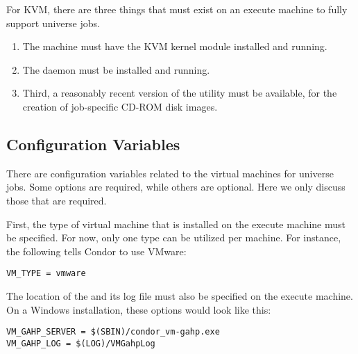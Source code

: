 For KVM, there are three things that must exist on
an execute machine to fully support  universe jobs. 
\begin{enumerate}
\item
The machine must have the KVM kernel module installed and running.

\item
The  daemon must be installed and running.

\item
Third, a reasonably recent version of the  
utility must be available,
for the creation of job-specific CD-ROM disk images. 
\end{enumerate}

\subsection{Configuration Variables}

There are configuration variables related to the virtual machines
for  universe jobs.
Some options are required, while others are optional.
Here we only discuss those that are required.

First, the type of virtual machine that is installed on the
execute machine must be specified. 
For now, only one type can be utilized per machine.
For instance, the following tells Condor to use VMware:

\begin{verbatim}
VM_TYPE = vmware
\end{verbatim}

The location of the  and
its log file must also be specified on the execute machine.
On a Windows installation, these options would look like this:

\begin{verbatim}
VM_GAHP_SERVER = $(SBIN)/condor_vm-gahp.exe
VM_GAHP_LOG = $(LOG)/VMGahpLog
\end{verbatim}





